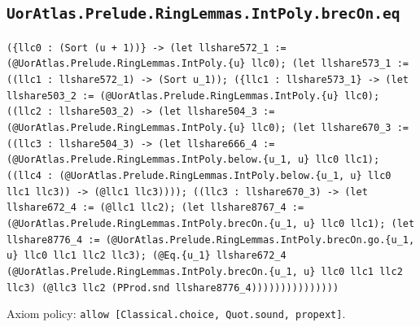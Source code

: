 \documentclass[11pt]{article}
\begin{document}
\subsection*{\texttt{UorAtlas.Prelude.RingLemmas.IntPoly.brecOn.eq}}
\noindent\texttt{(\{llc0 : (Sort (u + 1))\} -> (let llshare572\_1 := (@UorAtlas.Prelude.RingLemmas.IntPoly.\{u\} llc0); (let llshare573\_1 := ((llc1 : llshare572\_1) -> (Sort u\_1)); (\{llc1 : llshare573\_1\} -> (let llshare503\_2 := (@UorAtlas.Prelude.RingLemmas.IntPoly.\{u\} llc0); ((llc2 : llshare503\_2) -> (let llshare504\_3 := (@UorAtlas.Prelude.RingLemmas.IntPoly.\{u\} llc0); (let llshare670\_3 := ((llc3 : llshare504\_3) -> (let llshare666\_4 := (@UorAtlas.Prelude.RingLemmas.IntPoly.below.\{u\_1, u\} llc0 llc1); ((llc4 : (@UorAtlas.Prelude.RingLemmas.IntPoly.below.\{u\_1, u\} llc0 llc1 llc3)) -> (@llc1 llc3)))); ((llc3 : llshare670\_3) -> (let llshare672\_4 := (@llc1 llc2); (let llshare8767\_4 := (@UorAtlas.Prelude.RingLemmas.IntPoly.brecOn.\{u\_1, u\} llc0 llc1); (let llshare8776\_4 := (@UorAtlas.Prelude.RingLemmas.IntPoly.brecOn.go.\{u\_1, u\} llc0 llc1 llc2 llc3); (@Eq.\{u\_1\} llshare672\_4 (@UorAtlas.Prelude.RingLemmas.IntPoly.brecOn.\{u\_1, u\} llc0 llc1 llc2 llc3) (@llc3 llc2 (PProd.snd llshare8776\_4)))))))))))))))}\par
\noindent Axiom policy: \texttt{allow [Classical.choice, Quot.sound, propext]}.\par
\end{document}
